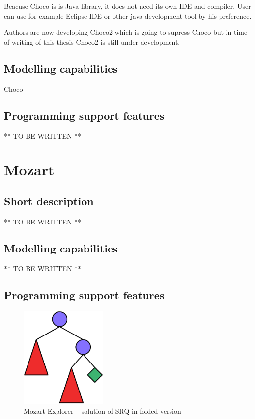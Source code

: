 Beacuse Choco is is Java library, it does not need its own IDE and compiler. User can
use for example Eclipse IDE or other java development tool by his preference.

Authors are now developing Choco2 which is going to supress Choco but in time of 
writing of this thesis Choco2 is still under development.

\subsection{Modelling capabilities}

Choco 

\subsection{Programming support features}

** TO BE WRITTEN **

\section{Mozart}

\subsection{Short description}

** TO BE WRITTEN **

\subsection{Modelling capabilities}

** TO BE WRITTEN **

\subsection{Programming support features}

\begin{figure}
\caption{\label{srq-mozart-folded}Mozart Explorer -- solution of SRQ in folded version}
\begin{center}
\includegraphics[height=5cm]{images/mozart/srq.oz.color.folded.eps}
\end{center}
\end{figure}

